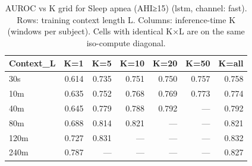 \begin{table}[ht]
\centering
\caption{AUROC vs K grid for Sleep apnea (AHI≥15) (lstm, channel: fast). Rows: training context length L. Columns: inference-time K (windows per subject). Cells with identical K×L are on the same iso-compute diagonal.}
\label{tab:kgrid_apnea_binary_lstm_fast}
\begin{tabular}{lrrrrrr}
\toprule
Context_L & K=1 & K=5 & K=10 & K=20 & K=50 & K=all \\
\midrule
30s & 0.614 & 0.735 & 0.751 & 0.750 & 0.757 & 0.758 \\
10m & 0.635 & 0.752 & 0.768 & 0.769 & 0.773 & 0.774 \\
40m & 0.645 & 0.779 & 0.788 & 0.792 & — & 0.792 \\
80m & 0.688 & 0.814 & 0.821 & — & — & 0.821 \\
120m & 0.727 & 0.831 & — & — & — & 0.832 \\
240m & 0.787 & — & — & — & — & 0.827 \\
\bottomrule
\end{tabular}
\end{table}